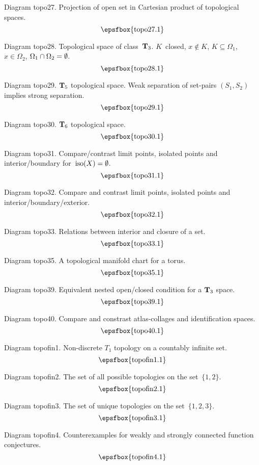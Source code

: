 Diagram topo27. Projection of open set in Cartesian product of topological
spaces.
$$
\centerline{\epsfbox{topo27.1}}
$$

Diagram topo28. Topological space of class~${\bf T}_3$. $K$~closed, $x\notin K$,
$K\subseteq\Omega_1$, $x\in\Omega_2$, $\Omega_1\mathbin{\cap}\Omega_2=\emptyset$.
$$
\centerline{\epsfbox{topo28.1}}
$$

Diagram topo29. ${\bf T}_5$ topological space. Weak separation of set-pairs
$(S_1,S_2)$ implies strong separation.
$$
\centerline{\epsfbox{topo29.1}}
$$

Diagram topo30. ${\bf T}_6$ topological space.
$$
\centerline{\epsfbox{topo30.1}}
$$

Diagram topo31. Compare/contrast limit points, isolated points and
interior/boundary for~$\mathop{\rm iso}\nolimits(X)=\emptyset$.
$$
\centerline{\epsfbox{topo31.1}}
$$

\filleject

Diagram topo32. Compare and contrast limit points, isolated points and
interior/boundary/exterior.
$$
\centerline{\epsfbox{topo32.1}}
$$

Diagram topo33. Relations between interior and closure of a set.
$$
\centerline{\epsfbox{topo33.1}}
$$

Diagram topo35. A topological manifold chart for a torus.
$$
\centerline{\epsfbox{topo35.1}}
$$

Diagram topo39. Equivalent nested open/closed condition for a ${\bf T}_3$ space.
$$
\centerline{\epsfbox{topo39.1}}
$$

\filleject

Diagram topo40. Compare and constrast atlas-collages and identification spaces.
$$
\centerline{\epsfbox{topo40.1}}
$$

\secteject
\edef\SECTtopofin{\the\pageno}

Diagram topofin1. Non-discrete $T_1$ topology on a countably infinite set.
$$
\centerline{\epsfbox{topofin1.1}}
$$

Diagram topofin2. The set of all possible topologies on the set~$\{1,2\}$.
$$
\centerline{\epsfbox{topofin2.1}}
$$

Diagram topofin3. The set of unique topologies on the set~$\{1,2,3\}$.
$$
\centerline{\epsfbox{topofin3.1}}
$$

Diagram topofin4. Counterexamples for weakly and strongly connected function
conjectures.
$$
\centerline{\epsfbox{topofin4.1}}
$$

